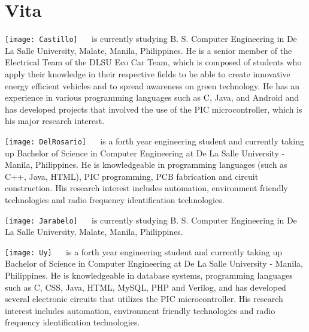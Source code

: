 \chapter{Vita}



\texttt{[image: Castillo]}
 \  \ is currently studying B. S. Computer Engineering in De La Salle University, Malate, Manila, Philippines. He is a senior member of the Electrical Team of the DLSU Eco Car Team, which is composed of students who apply their knowledge in their respective fields to be able to create innovative energy efficient vehicles and to spread awareness on green technology. He has an experience in various programming languages such as C, Java, and Android and has developed projects that involved the use of the PIC microcontroller, which is his major research interest. 

\texttt{[image: DelRosario]}
 \  \ is a forth year engineering student and currently taking up Bachelor of Science in Computer Engineering at De La Salle University - Manila, Philippines. He is knowledgeable in programming languages (such as C++, Java, HTML), PIC programming, PCB fabrication and circuit construction.  His research interest includes automation, environment friendly technologies and radio frequency identification technologies.

\texttt{[image: Jarabelo]}
 \  \ is currently studying B. S. Computer Engineering in De La Salle University, Malate, Manila, Philippines. 

\texttt{[image: Uy]}
 \  \ is a forth year engineering student and currently taking up Bachelor of Science in Computer Engineering at De La Salle University - Manila, Philippines. He is knowledgeable in database systems, programming languages such as C, CSS, Java, HTML, MySQL, PHP and Verilog, and has developed several electronic circuits that utilizes the PIC microcontroller. His research interest includes automation, environment friendly technologies and radio frequency identification technologies.


